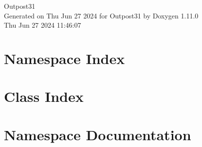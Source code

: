 \documentclass[twoside]{book}
\newcommand{\+}{\discretionary{\mbox{\scriptsize$\hookleftarrow$}}{}{}}
\newcommand{\clearemptydoublepage}{%
    \newpage{\pagestyle{empty}\cleardoublepage}%
  }
\begin{document}
  \raggedbottom
    \hypersetup{pageanchor=false,
                bookmarksnumbered=true,
                pdfencoding=unicode
               }
  \begin{titlepage}
  \vspace*{7cm}
  \begin{center}%
  {\Large Outpost31}\\
  \vspace*{1cm}
  {\large Generated on Thu Jun 27 2024 for Outpost31 by Doxygen 1.11.0}\\
    \vspace*{0.5cm}
    {\small Thu Jun 27 2024 11:46:07}
  \end{center}
  \end{titlepage}
  \clearemptydoublepage
  \tableofcontents
  \clearemptydoublepage
  \hypersetup{pageanchor=true}

\chapter{Namespace Index}

\chapter{Class Index}

\chapter{Namespace Documentation}


















\end{document}
